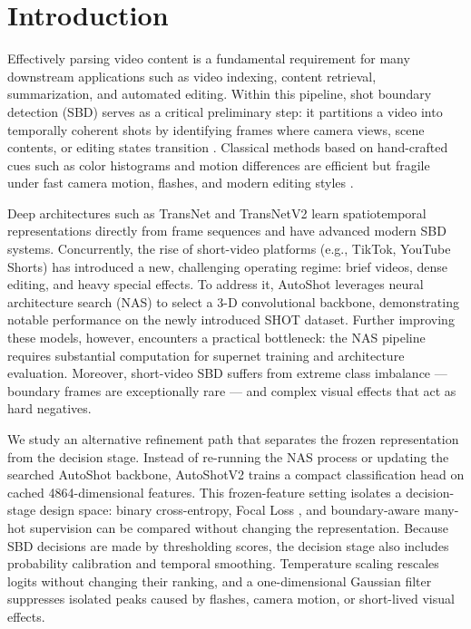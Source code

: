 \section{Introduction}

Effectively parsing video content is a fundamental requirement for many
downstream applications such as video indexing, content retrieval,
summarization, and automated editing. Within this pipeline, shot boundary
detection (SBD) serves as a critical preliminary step: it partitions a video
into temporally coherent shots by identifying frames where camera
views, scene contents, or editing states transition
\cite{seridi2020survey,kar2024review}. Classical methods based on
hand-crafted cues such as color histograms and motion differences are
efficient but fragile under fast camera motion, flashes, and modern editing
styles \cite{abdulhussain2018review}.

Deep architectures such as TransNet and TransNetV2
\cite{soucek2019transnet,soucek2020transnetv2} learn spatiotemporal
representations directly from frame sequences and have advanced modern SBD
systems. Concurrently, the rise of short-video
platforms (e.g., TikTok, YouTube Shorts) has introduced a new, challenging
operating regime: brief videos, dense editing, and heavy special effects. To
address it, AutoShot \cite{zhu2023autoshot} leverages neural architecture
search (NAS) to select a 3-D convolutional backbone, demonstrating notable
performance on the newly introduced SHOT dataset. Further improving these
models, however, encounters a practical bottleneck: the NAS pipeline requires
substantial computation for supernet training and architecture evaluation.
Moreover, short-video SBD suffers from extreme
class imbalance --- boundary frames are exceptionally rare --- and complex
visual effects that act as hard negatives.

We study an alternative refinement path that separates the frozen
representation from the decision stage. Instead of re-running the NAS process
or updating the searched AutoShot backbone, AutoShotV2 trains a compact
classification head on cached 4864-dimensional features. This frozen-feature
setting isolates a decision-stage design space: binary cross-entropy, Focal
Loss \cite{lin2017focal}, and boundary-aware many-hot supervision can be
compared without changing the representation. Because SBD decisions are made
by thresholding scores, the decision stage also includes probability
calibration and temporal smoothing. Temperature scaling
\cite{guo2017calibration} rescales logits without changing their ranking,
and a one-dimensional Gaussian filter suppresses isolated peaks caused by
flashes, camera motion, or short-lived visual effects.

